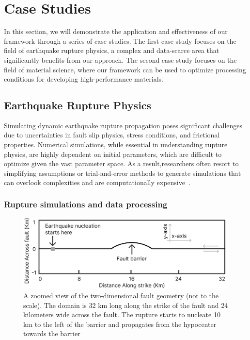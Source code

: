 \documentclass{article}
\begin{document}
\section{Case Studies}
In this section, we will demonstrate the application and effectiveness of our framework through a series of case studies. The first case study focuses on the field of earthquake rupture physics, a complex and data-scarce area that significantly benefits from our approach. The second case study focuses on the field of material science, where our framework can be used to optimize processing conditions for developing high-performance materials.

\subsection{Earthquake Rupture Physics}
Simulating dynamic earthquake rupture propagation poses significant challenges due to uncertainties in fault slip physics, stress conditions, and frictional properties. Numerical simulations, while essential in understanding rupture physics, are highly dependent on initial parameters, which are difficult to optimize given the vast parameter space. As a result,researchers often resort to simplifying assumptions or trial-and-error methods to generate simulations that can overlook complexities and are computationally expensive~\cite{ahamed2019estimating}.

\subsubsection{Rupture simulations and data processing}
\begin{figure}[ht]
    \begin{center}
        \includegraphics[scale=0.6]{figures/rupture_domain.png}
    \end{center}
    \caption{A zoomed view of the two-dimensional fault geometry (not to the scale). The domain is 32 km long along the strike of the fault and 24 kilometers wide across the fault. The rupture starts to nucleate 10 km to the left of the barrier and propagates from the hypocenter towards the barrier}
    \label{fig:rupture_domain}
\end{figure}
\end{document}
